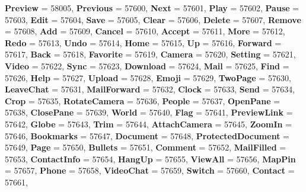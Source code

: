 \begin{DoxyCompactItemize}
{\bfseries Preview} = 58005, 
{\bfseries Previous} = 57600, 
{\bfseries Next} = 57601, 
\newline
{\bfseries Play} = 57602, 
{\bfseries Pause} = 57603, 
{\bfseries Edit} = 57604, 
{\bfseries Save} = 57605, 
\newline
{\bfseries Clear} = 57606, 
{\bfseries Delete} = 57607, 
{\bfseries Remove} = 57608, 
{\bfseries Add} = 57609, 
\newline
{\bfseries Cancel} = 57610, 
{\bfseries Accept} = 57611, 
{\bfseries More} = 57612, 
{\bfseries Redo} = 57613, 
\newline
{\bfseries Undo} = 57614, 
{\bfseries Home} = 57615, 
{\bfseries Up} = 57616, 
{\bfseries Forward} = 57617, 
\newline
{\bfseries Back} = 57618, 
{\bfseries Favorite} = 57619, 
{\bfseries Camera} = 57620, 
{\bfseries Setting} = 57621, 
\newline
{\bfseries Video} = 57622, 
{\bfseries Sync} = 57623, 
{\bfseries Download} = 57624, 
{\bfseries Mail} = 57625, 
\newline
{\bfseries Find} = 57626, 
{\bfseries Help} = 57627, 
{\bfseries Upload} = 57628, 
{\bfseries Emoji} = 57629, 
\newline
{\bfseries Two\+Page} = 57630, 
{\bfseries Leave\+Chat} = 57631, 
{\bfseries Mail\+Forward} = 57632, 
{\bfseries Clock} = 57633, 
\newline
{\bfseries Send} = 57634, 
{\bfseries Crop} = 57635, 
{\bfseries Rotate\+Camera} = 57636, 
{\bfseries People} = 57637, 
\newline
{\bfseries Open\+Pane} = 57638, 
{\bfseries Close\+Pane} = 57639, 
{\bfseries World} = 57640, 
{\bfseries Flag} = 57641, 
\newline
{\bfseries Preview\+Link} = 57642, 
{\bfseries Globe} = 57643, 
{\bfseries Trim} = 57644, 
{\bfseries Attach\+Camera} = 57645, 
\newline
{\bfseries Zoom\+In} = 57646, 
{\bfseries Bookmarks} = 57647, 
{\bfseries Document} = 57648, 
{\bfseries Protected\+Document} = 57649, 
\newline
{\bfseries Page} = 57650, 
{\bfseries Bullets} = 57651, 
{\bfseries Comment} = 57652, 
{\bfseries Mail\+Filled} = 57653, 
\newline
{\bfseries Contact\+Info} = 57654, 
{\bfseries Hang\+Up} = 57655, 
{\bfseries View\+All} = 57656, 
{\bfseries Map\+Pin} = 57657, 
\newline
{\bfseries Phone} = 57658, 
{\bfseries Video\+Chat} = 57659, 
{\bfseries Switch} = 57660, 
{\bfseries Contact} = 57661, 

\end{DoxyCompactItemize}
